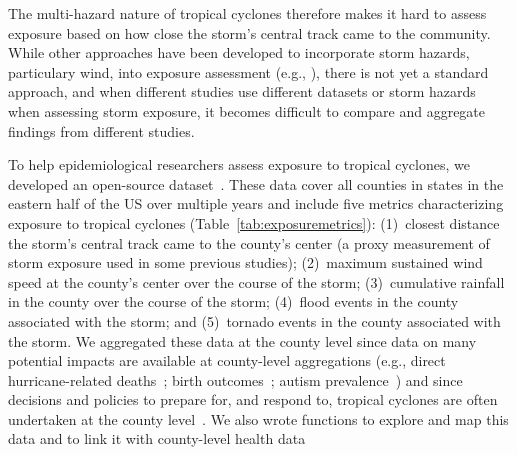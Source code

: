 The multi-hazard nature of tropical cyclones therefore makes it hard to assess
exposure based on how close the storm's central
track came to the community.  While other approaches have been developed to
incorporate storm hazards, particulary wind, into exposure assessment (e.g.,
\cite{grabich2015measuring, zandbergen2009, czajkowski2011}), there is not yet
a standard approach, and when different studies use different datasets or storm
hazards when assessing storm exposure, it becomes difficult to compare and
aggregate findings from different studies. 

To help epidemiological researchers assess exposure to tropical cyclones, we
developed an open-source dataset~\parencite{hurricaneexposure}.  These data
cover all counties in states in the eastern half of the \ac{US} over multiple
years and include five metrics characterizing exposure to tropical cyclones
(Table~\ref{tab:exposuremetrics}): (1)~closest distance the storm's central
track came to the county's center (a proxy measurement of storm exposure used
in some previous studies); (2)~maximum sustained wind speed at the county's
center over the course of the storm; (3)~cumulative rainfall in the county over
the course of the storm; (4)~flood events in the county associated with the
storm; and (5)~tornado events in the county associated with the storm.  We
aggregated these data at the county level since data on many potential impacts
are available at county-level aggregations (e.g., direct hurricane-related
deaths~\parencite{czajkowski2011}; birth outcomes~\parencite{grabich2015,
grabich2015measuring}; autism prevalence~\parencite{kinney2008}) and since
decisions and policies to prepare for, and respond to, tropical cyclones are
often undertaken at the county level~\parencite{zandbergen2009, rappaport2000}.
We also wrote functions to explore and map this data and to link it
with county-level health data~\parencite{hurricaneexposuredata} 

